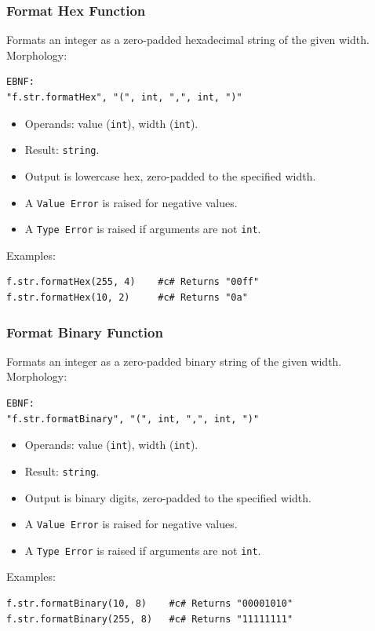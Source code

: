 \subsubsection{Format Hex Function}
Formats an integer as a zero-padded hexadecimal string of the given width. \\
Morphology:
\begin{verbatim}
EBNF:
"f.str.formatHex", "(", int, ",", int, ")"
\end{verbatim}
\begin{itemize}
\item Operands: value (\texttt{int}), width (\texttt{int}).
\item Result: \texttt{string}.
\item Output is lowercase hex, zero-padded to the specified width.
\item A \texttt{Value Error} is raised for negative values.
\item A \texttt{Type Error} is raised if arguments are not \texttt{int}.
\end{itemize}
Examples:
\begin{verbatim}
f.str.formatHex(255, 4)    #c# Returns "00ff"
f.str.formatHex(10, 2)     #c# Returns "0a"
\end{verbatim}

\subsubsection{Format Binary Function}
Formats an integer as a zero-padded binary string of the given width. \\
Morphology:
\begin{verbatim}
EBNF:
"f.str.formatBinary", "(", int, ",", int, ")"
\end{verbatim}
\begin{itemize}
\item Operands: value (\texttt{int}), width (\texttt{int}).
\item Result: \texttt{string}.
\item Output is binary digits, zero-padded to the specified width.
\item A \texttt{Value Error} is raised for negative values.
\item A \texttt{Type Error} is raised if arguments are not \texttt{int}.
\end{itemize}
Examples:
\begin{verbatim}
f.str.formatBinary(10, 8)    #c# Returns "00001010"
f.str.formatBinary(255, 8)   #c# Returns "11111111"
\end{verbatim}


